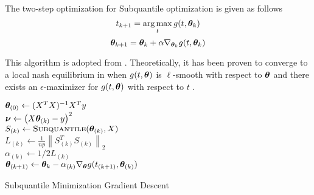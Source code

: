 \documentclass{article} %
\newcommand{\norm}[1]{\left\lVert#1\right\rVert}
\begin{document}
	The two-step optimization for Subquantile optimization is given as follows \vspace{1em}
	\begin{equation}
		\label{eqn:t-update}
		t_{k+1} = \operatorname*{arg\,max}_t g(t,{\bm{\theta}}_k) 
	\end{equation}
	\begin{equation}
		\label{eqn:theta-update}
		{\bm{\theta}}_{k+1} = {\bm{\theta}}_k + \alpha \nabla_{{\bm{\theta}}_k} g(t,{\bm{\theta}}_k)
	\end{equation}
		
	This algorithm is adopted from \cite{Razaviyayn}. Theoretically, it has been proven to converge to a local nash equilibrium in \cite{Jin_2019} when $g(t,{\bm{\theta}})$ is $\ell$-smooth with respect to ${\bm{\theta}}$ and there exists an $\epsilon$-maximizer for $g(t,{\bm{\theta}})$ with respect to $t$ .\\
	\begin{minipage}{0.48\textwidth}
	\begin{algorithm}[H]
		\DontPrintSemicolon
		
		${\bm{\theta}}_{(0)} \gets (X^T X)^{-1}X^T y$\\
		{
			$\displaystyle {\bm{\nu}} \gets \left(X{\bm{\theta}}_{(k)} - y\right)^2$\\
			$S_{(k)} \gets \textsc{Subquantile}({\bm{\theta}}_{(k)},X)$\\
			$L_{(k)} \gets \frac{1}{np}\norm{S_{(k)}^T S_{(k)}}_2$\\
			$\alpha_{(k)} \gets 1/2L_{(k)}$\\
			$\displaystyle {\bm{\theta}}_{(k+1)} \gets {\bm{\theta}}_k - \alpha_{(k)} \nabla_{\bm{\theta}} g(t_{(k+1)},{\bm{\theta}}_{(k)})$
		}
		\caption{Subquantile Minimization Gradient Descent}
		\label{alg:sqo1}
	\end{algorithm}
	\end{minipage}
	\hfill
\end{document}
